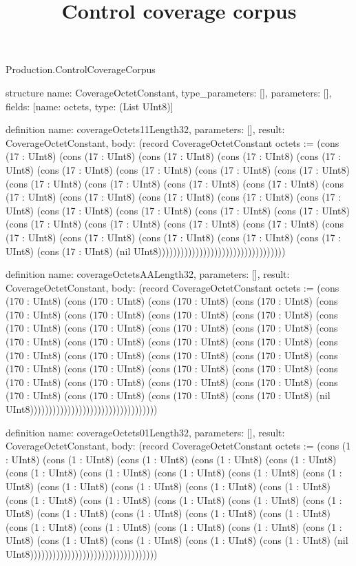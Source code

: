 \begin{lexlean}{Production.ControlCoverageCorpus}
\title{Control coverage corpus}
\begin{semanticmodule}
structure{
  name: CoverageOctetConstant,
  type_parameters: [],
  parameters: [],
  fields: [{name: octets, type: (List UInt8)}]
}

definition{
  name: coverageOctets11Length32,
  parameters: [],
  result: CoverageOctetConstant,
  body: (record CoverageOctetConstant {octets := (cons (17 : UInt8) (cons (17 : UInt8) (cons (17 : UInt8) (cons (17 : UInt8) (cons (17 : UInt8) (cons (17 : UInt8) (cons (17 : UInt8) (cons (17 : UInt8) (cons (17 : UInt8) (cons (17 : UInt8) (cons (17 : UInt8) (cons (17 : UInt8) (cons (17 : UInt8) (cons (17 : UInt8) (cons (17 : UInt8) (cons (17 : UInt8) (cons (17 : UInt8) (cons (17 : UInt8) (cons (17 : UInt8) (cons (17 : UInt8) (cons (17 : UInt8) (cons (17 : UInt8) (cons (17 : UInt8) (cons (17 : UInt8) (cons (17 : UInt8) (cons (17 : UInt8) (cons (17 : UInt8) (cons (17 : UInt8) (cons (17 : UInt8) (cons (17 : UInt8) (cons (17 : UInt8) (cons (17 : UInt8) (nil UInt8)))))))))))))))))))))))))))))))))})
}

definition{
  name: coverageOctetsAALength32,
  parameters: [],
  result: CoverageOctetConstant,
  body: (record CoverageOctetConstant {octets := (cons (170 : UInt8) (cons (170 : UInt8) (cons (170 : UInt8) (cons (170 : UInt8) (cons (170 : UInt8) (cons (170 : UInt8) (cons (170 : UInt8) (cons (170 : UInt8) (cons (170 : UInt8) (cons (170 : UInt8) (cons (170 : UInt8) (cons (170 : UInt8) (cons (170 : UInt8) (cons (170 : UInt8) (cons (170 : UInt8) (cons (170 : UInt8) (cons (170 : UInt8) (cons (170 : UInt8) (cons (170 : UInt8) (cons (170 : UInt8) (cons (170 : UInt8) (cons (170 : UInt8) (cons (170 : UInt8) (cons (170 : UInt8) (cons (170 : UInt8) (cons (170 : UInt8) (cons (170 : UInt8) (cons (170 : UInt8) (cons (170 : UInt8) (cons (170 : UInt8) (cons (170 : UInt8) (cons (170 : UInt8) (nil UInt8)))))))))))))))))))))))))))))))))})
}

definition{
  name: coverageOctets01Length32,
  parameters: [],
  result: CoverageOctetConstant,
  body: (record CoverageOctetConstant {octets := (cons (1 : UInt8) (cons (1 : UInt8) (cons (1 : UInt8) (cons (1 : UInt8) (cons (1 : UInt8) (cons (1 : UInt8) (cons (1 : UInt8) (cons (1 : UInt8) (cons (1 : UInt8) (cons (1 : UInt8) (cons (1 : UInt8) (cons (1 : UInt8) (cons (1 : UInt8) (cons (1 : UInt8) (cons (1 : UInt8) (cons (1 : UInt8) (cons (1 : UInt8) (cons (1 : UInt8) (cons (1 : UInt8) (cons (1 : UInt8) (cons (1 : UInt8) (cons (1 : UInt8) (cons (1 : UInt8) (cons (1 : UInt8) (cons (1 : UInt8) (cons (1 : UInt8) (cons (1 : UInt8) (cons (1 : UInt8) (cons (1 : UInt8) (cons (1 : UInt8) (cons (1 : UInt8) (cons (1 : UInt8) (nil UInt8)))))))))))))))))))))))))))))))))})
}


\end{semanticmodule}
\end{lexlean}
